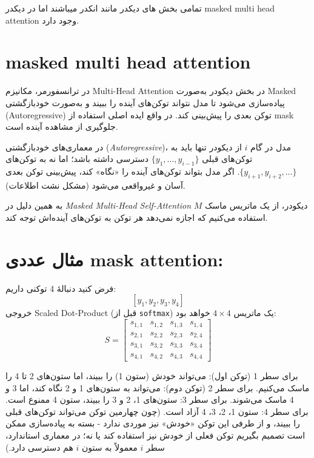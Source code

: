 تمامی بخش های دیکدر مانند انکدر میباشند اما در دیکدر masked multi head attention  وجود دارد.

\section{masked multi head attention}


در ترانسفورمر، مکانیزم Multi-Head Attention در بخش دیکودر به‌صورت Masked پیاده‌سازی می‌شود تا مدل نتواند توکن‌های آینده را ببیند و به‌صورت خودبازگشتی (Autoregressive) توکن بعدی را پیش‌بینی کند.
در واقع ایده اصلی استفاده از mask  جلوگیری از مشاهده آینده است.




 در معماری‌های خودبازگشتی (\textit{Autoregressive})، مدل در گام \( i \) از دیکودر تنها باید به توکن‌های قبلی \( \{ y_1, \dots, y_{i-1} \} \) دسترسی داشته باشد؛ اما نه به توکن‌های \( \{ y_{i+1}, y_{i+2}, \dots \} \). اگر مدل بتواند توکن‌های آینده را «نگاه» کند، پیش‌بینی توکن بعدی آسان و غیرواقعی می‌شود (مشکل نشت اطلاعات).
 
 به همین دلیل در \textit{Masked Multi-Head Self-Attention} دیکودر، از یک ماتریس ماسک \( M \) استفاده می‌کنیم که اجازه نمی‌دهد هر توکن به توکن‌های آینده‌اش توجه کند.
 
 \section{مثال عددی mask attention:}
 
 فرض کنید دنبالهٔ 4 توکنی داریم:
 \[
 [y_1, y_2, y_3, y_4]
 \]
 خروجی Scaled Dot-Product (قبل از \texttt{softmax}) یک ماتریس \( 4 \times 4 \) خواهد بود:
 \[
 S =
 \begin{bmatrix}
 	s_{1,1} & s_{1,2} & s_{1,3} & s_{1,4} \\
 	s_{2,1} & s_{2,2} & s_{2,3} & s_{2,4} \\
 	s_{3,1} & s_{3,2} & s_{3,3} & s_{3,4} \\
 	s_{4,1} & s_{4,2} & s_{4,3} & s_{4,4}
 \end{bmatrix}
 \]
 
 برای سطر 1 (توکن اول): می‌تواند خودش (ستون 1) را ببیند، اما ستون‌های 2 تا 4 را ماسک می‌کنیم.
 برای سطر 2 (توکن دوم): می‌تواند به ستون‌های 1 و 2 نگاه کند، اما 3 و 4 ماسک می‌شوند.
 برای سطر 3: ستون‌های 1، 2 و 3 را ببیند، ستون 4 ممنوع است.
 برای سطر 4: ستون 1، 2، 3، 4 آزاد است. (چون چهارمین توکن می‌تواند توکن‌های قبلی را ببیند، و از طرفی این توکن «خودش» نیز موردی ندارد - بسته به پیاده‌سازی ممکن است تصمیم بگیریم توکن فعلی از خودش نیز استفاده کند یا نه؛ در معماری استاندارد، سطر \( i \) معمولاً به ستون \( i \) هم دسترسی دارد.)
 
